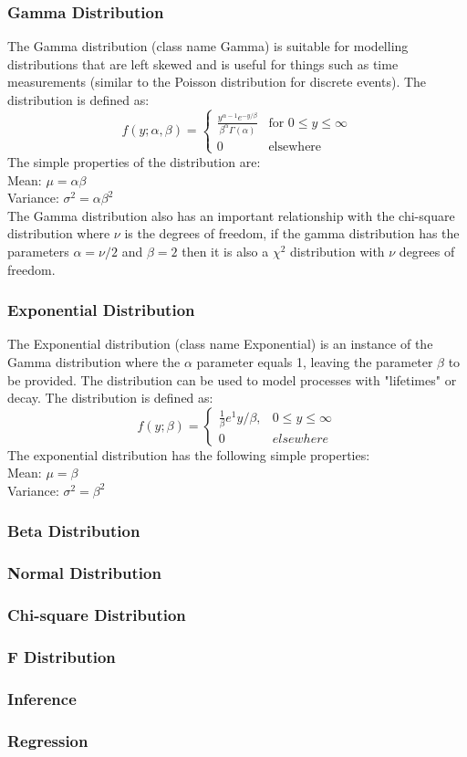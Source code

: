 \documentclass[a4paper]{article}
\begin{document}
\subsubsection*{Gamma Distribution}
The Gamma distribution (class name Gamma) is suitable for modelling distributions that are left skewed and is useful for things such as time measurements (similar to the Poisson distribution for discrete events). The distribution is defined as:
\[
f(y; \alpha, \beta) = 
	\begin{cases}
		\frac{ y^{\alpha - 1}e^{-y/\beta} }{ \beta^{\alpha} \Gamma(\alpha) } & \text{for } 0 \le y \le \infty \\
		0 & \text{elsewhere}
	\end{cases}
\]
The simple properties of the distribution are:\\
Mean: $\mu = \alpha\beta$\\
Variance: $\sigma^2 = \alpha\beta^2$\\
The Gamma distribution also has an important relationship with the chi-square distribution where $\nu$ is the degrees of freedom, if the gamma distribution has the parameters $\alpha = \nu/2$ and $\beta = 2$ then it is also a $\chi^2$ distribution with $\nu$ degrees of freedom. \\
\subsubsection*{Exponential Distribution}
The Exponential distribution (class name Exponential) is an instance of the Gamma distribution where the $\alpha$ parameter equals 1, leaving the parameter $\beta$ to be provided. The distribution can be used to model processes with "lifetimes" or decay. The distribution is defined as:
\[
f(y; \beta) =
	\begin{cases}
		\frac{1}{\beta} e^1{y/\beta}, & 0 \le y \le \infty\\
		0 & elsewhere
	\end{cases}
\]
The exponential distribution has the following simple properties:\\
Mean: $\mu = \beta$\\
Variance: $\sigma^2 = \beta^2$


\subsubsection*{Beta Distribution}

\subsubsection*{Normal Distribution}

\subsubsection*{Chi-square Distribution}

\subsubsection*{F Distribution}


\subsubsection{Inference}

\subsubsection{Regression}
\end{document}
